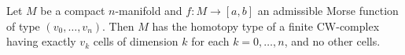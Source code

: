Let $M$ be a compact $n$-manifold and $f: M \to [a, b]$ an admissible Morse function of type $(v_0, \ldots, v_n)$. Then $M$ has the homotopy type of a finite CW-complex having exactly $v_k$ cells of dimension $k$ for each $k = 0, \ldots, n$, and no other cells.
